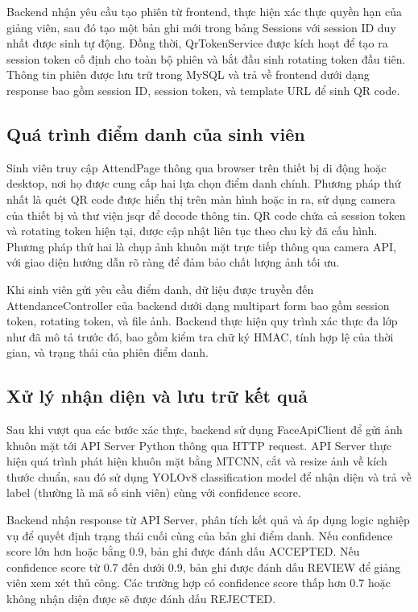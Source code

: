 \documentclass[12pt,a4paper]{report}
\begin{document}
Backend nhận yêu cầu tạo phiên từ frontend, thực hiện xác thực quyền hạn của giảng viên, sau đó tạo một bản ghi mới trong bảng Sessions với session ID duy nhất được sinh tự động. Đồng thời, QrTokenService được kích hoạt để tạo ra session token cố định cho toàn bộ phiên và bắt đầu sinh rotating token đầu tiên. Thông tin phiên được lưu trữ trong MySQL và trả về frontend dưới dạng response bao gồm session ID, session token, và template URL để sinh QR code.

\subsection{Quá trình điểm danh của sinh viên}
Sinh viên truy cập AttendPage thông qua browser trên thiết bị di động hoặc desktop, nơi họ được cung cấp hai lựa chọn điểm danh chính. Phương pháp thứ nhất là quét QR code được hiển thị trên màn hình hoặc in ra, sử dụng camera của thiết bị và thư viện jsqr để decode thông tin. QR code chứa cả session token và rotating token hiện tại, được cập nhật liên tục theo chu kỳ đã cấu hình. Phương pháp thứ hai là chụp ảnh khuôn mặt trực tiếp thông qua camera API, với giao diện hướng dẫn rõ ràng để đảm bảo chất lượng ảnh tối ưu.

Khi sinh viên gửi yêu cầu điểm danh, dữ liệu được truyền đến AttendanceController của backend dưới dạng multipart form bao gồm session token, rotating token, và file ảnh. Backend thực hiện quy trình xác thực đa lớp như đã mô tả trước đó, bao gồm kiểm tra chữ ký HMAC, tính hợp lệ của thời gian, và trạng thái của phiên điểm danh.

\subsection{Xử lý nhận diện và lưu trữ kết quả}
Sau khi vượt qua các bước xác thực, backend sử dụng FaceApiClient để gửi ảnh khuôn mặt tới API Server Python thông qua HTTP request. API Server thực hiện quá trình phát hiện khuôn mặt bằng MTCNN, cắt và resize ảnh về kích thước chuẩn, sau đó sử dụng YOLOv8 classification model để nhận diện và trả về label (thường là mã số sinh viên) cùng với confidence score.

Backend nhận response từ API Server, phân tích kết quả và áp dụng logic nghiệp vụ để quyết định trạng thái cuối cùng của bản ghi điểm danh. Nếu confidence score lớn hơn hoặc bằng 0.9, bản ghi được đánh dấu ACCEPTED. Nếu confidence score từ 0.7 đến dưới 0.9, bản ghi được đánh dấu REVIEW để giảng viên xem xét thủ công. Các trường hợp có confidence score thấp hơn 0.7 hoặc không nhận diện được sẽ được đánh dấu REJECTED.
\end{document}
